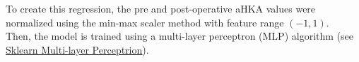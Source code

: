 \documentclass{article}
\begin{document}
To create this regression, the pre and post-operative aHKA values were normalized using the min-max scaler
method with feature range $(-1, 1)$.\\
Then, the model is trained using a multi-layer perceptron (MLP) algorithm 
(see \href{https://scikit-learn.org/stable/modules/generated/sklearn.neural_network.MLPRegressor.html}{\underline{Sklearn Multi-layer Perceptrion}}).

\medskip

\printbibliography
\end{document}
